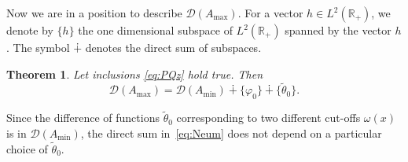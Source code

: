 \documentclass[pdftex]{sigma}%
\numberwithin{equation}{section}
\newtheorem{Theorem}{Theorem}[section]
\begin{document}
Now we are in a position to describe ${\mathcal D}(A_{\max})$.
 For a vector $h\in L^2 ({\mathbb R}_{+})$, we denote by $\{h\}$ the one dimensional subspace of $L^2 ({\mathbb R}_{+})$ spanned by the vector $h$. The symbol $\dotplus$ denotes the direct sum of subspaces.

 \begin{Theorem}\label{Neum}
 Let inclusions \eqref{eq:PQz} hold true.
Then
\begin{equation}
{\mathcal D}(A_{\max})= {\mathcal D}(A_{\min}) \dotplus \{\varphi_{0 } \}\dotplus \big\{\tilde{\theta}_{0} \big\}.
 \label{eq:Neum}\end{equation}
 \end{Theorem}

 \begin{Remark}\label{Neur}
 Since the difference of functions $\tilde{\theta}_0 $ corresponding to two different cut-offs $\omega(x)$ is in ${\mathcal D}(A_{\min})$, the direct sum in~\eqref{eq:Neum} does not depend on a particular choice of $\tilde{\theta}_0$.
 \end{Remark}
\end{document}
